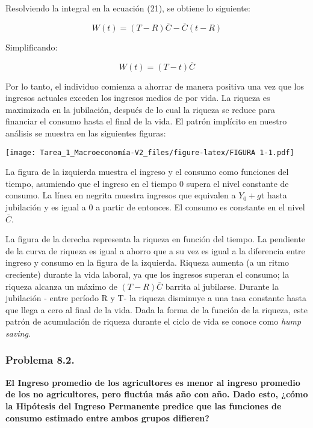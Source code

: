 \documentclass[
]{article}
\begin{document}
Resolviendo la integral en la ecuación (21), se obtiene lo siguiente:

\begin{equation}
W(t)=(T-R)\bar C-\bar C(t-R)
\end{equation}

Simplificando:

\begin{equation}
W(t)=(T-t)\bar C
\end{equation}

Por lo tanto, el individuo comienza a ahorrar de manera positiva una vez
que los ingresos actuales exceden los ingresos medios de por vida. La
riqueza es maximizada en la jubilación, después de lo cual la riqueza se
reduce para financiar el consumo hasta el final de la vida. El patrón
implícito en nuestro análisis se muestra en las siguientes figuras:

\texttt{[image: Tarea\_1\_Macroeconomía-V2\_files/figure-latex/FIGURA 1-1.pdf]}

La figura de la izquierda muestra el ingreso y el consumo como funciones
del tiempo, asumiendo que el ingreso en el tiempo 0 supera el nivel
constante de consumo. La línea en negrita muestra ingresos que equivalen
a \(Y_0 + g\)t hasta jubilación y es igual a 0 a partir de entonces. El
consumo es constante en el nivel \(\bar C\).

La figura de la derecha representa la riqueza en función del tiempo. La
pendiente de la curva de riqueza es igual a ahorro que a su vez es igual
a la diferencia entre ingreso y consumo en la figura de la izquierda.
Riqueza aumenta (a un ritmo creciente) durante la vida laboral, ya que
los ingresos superan el consumo; la riqueza alcanza un máximo de
\((T-R)\bar C\) barrita al jubilarse. Durante la jubilación - entre
período R y T- la riqueza disminuye a una tasa constante hasta que llega
a cero al final de la vida. Dada la forma de la función de la riqueza,
este patrón de acumulación de riqueza durante el ciclo de vida se conoce
como \emph{hump saving}.

\hypertarget{problema-8.2.}{%
\subsubsection{Problema 8.2.}\label{problema-8.2.}}

\textbf{El Ingreso promedio de los agricultores es menor al ingreso
promedio de los no agricultores, pero fluctúa más año con año. Dado
esto, ¿cómo la Hipótesis del Ingreso Permanente predice que las
funciones de consumo estimado entre ambos grupos difieren?}
\end{document}
